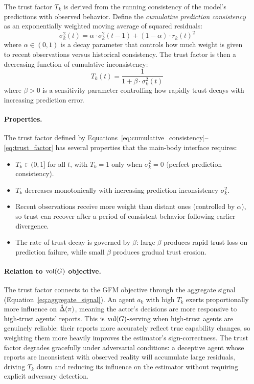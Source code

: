 The trust factor $T_k$ is derived from the running consistency of the model's predictions with observed behavior. Define the \emph{cumulative prediction consistency} as an exponentially weighted moving average of squared residuals:
\begin{equation}
\label{eq:cumulative_consistency}
\sigma_k^2(t) = \alpha \cdot \sigma_k^2(t-1) + (1 - \alpha) \cdot r_k(t)^2
\end{equation}
where $\alpha \in (0, 1)$ is a decay parameter that controls how much weight is given to recent observations versus historical consistency. The trust factor is then a decreasing function of cumulative inconsistency:
\begin{equation}
\label{eq:trust_factor}
T_k(t) = \frac{1}{1 + \beta \cdot \sigma_k^2(t)}
\end{equation}
where $\beta > 0$ is a sensitivity parameter controlling how rapidly trust decays with increasing prediction error.

\paragraph{Properties.} The trust factor defined by Equations~\eqref{eq:cumulative_consistency}--\eqref{eq:trust_factor} has several properties that the main-body interface requires:
\begin{itemize}
\item $T_k \in (0, 1]$ for all $t$, with $T_k = 1$ only when $\sigma_k^2 = 0$ (perfect prediction consistency).
\item $T_k$ decreases monotonically with increasing prediction inconsistency $\sigma_k^2$.
\item Recent observations receive more weight than distant ones (controlled by $\alpha$), so trust can recover after a period of consistent behavior following earlier divergence.
\item The rate of trust decay is governed by $\beta$: large $\beta$ produces rapid trust loss on prediction failure, while small $\beta$ produces gradual trust erosion.
\end{itemize}

\paragraph{Relation to $\operatorname{vol}(G)$ objective.} The trust factor connects to the GFM objective through the aggregate signal (Equation~\eqref{eq:aggregate_signal}). An agent $a_k$ with high $T_k$ exerts proportionally more influence on $\hat{\Delta}(\pi)$, meaning the actor's decisions are more responsive to high-trust agents' reports. This is $\operatorname{vol}(G)$-serving when high-trust agents are genuinely reliable: their reports more accurately reflect true capability changes, so weighting them more heavily improves the estimator's sign-correctness. The trust factor degrades gracefully under adversarial conditions: a deceptive agent whose reports are inconsistent with observed reality will accumulate large residuals, driving $T_k$ down and reducing its influence on the estimator without requiring explicit adversary detection.


